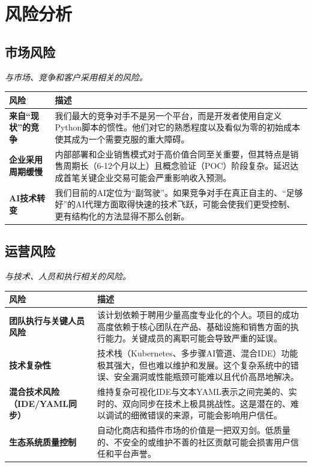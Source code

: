\documentclass[11pt, a4paper, oneside]{article}
\begin{document}
\newpage
\section{风险分析}
\subsection{市场风险}
\textit{与市场、竞争和客户采用相关的风险。}

\begin{table}[H]
\centering
\begin{tabularx}{\textwidth}{@{}lL@{}}
\toprule
\textbf{风险} & \textbf{描述} \\
\midrule
\textbf{来自“现状”的竞争} & 我们最大的竞争对手不是另一个平台，而是开发者使用自定义Python脚本的惯性。他们对它的熟悉程度以及看似为零的初始成本使其成为一个需要克服的重大障碍。 \\
\addlinespace
\textbf{企业采用周期缓慢} & 内部部署和企业销售模式对于高价值合同至关重要，但其特点是销售周期长（6-12个月以上）且概念验证（POC）阶段复杂。延迟达成首笔关键企业交易可能会严重影响收入预测。 \\
\addlinespace
\textbf{AI技术转变} & 我们目前的AI定位为“副驾驶”。如果竞争对手在真正自主的、“足够好”的AI代理方面取得快速的技术飞跃，可能会使我们更受控制、更有结构化的方法显得不那么创新。 \\
\bottomrule
\end{tabularx}
\end{table}

\newpage
\subsection{运营风险}
\textit{与技术、人员和执行相关的风险。}

\begin{table}[H]
\centering
\begin{tabularx}{\textwidth}{@{}lL@{}}
\toprule
\textbf{风险} & \textbf{描述} \\



\midrule
\textbf{团队执行与关键人员风险} & 该计划依赖于聘用少量高度专业化的个人。项目的成功高度依赖于核心团队在产品、基础设施和销售方面的执行能力。关键成员的离职可能会导致严重的延误。 \\
\addlinespace
\textbf{技术复杂性} & 技术栈（Kubernetes、多步骤AI管道、混合IDE）功能极其强大，但也难以维护和发展。这个复杂系统中的错误、安全漏洞或性能瓶颈可能难以且代价高昂地解决。 \\
\addlinespace
\textbf{混合技术风险（IDE/YAML同步）} & 维持复杂可视化IDE与文本YAML表示之间完美的、实时的、双向同步在技术上极具挑战性。这是潜在的、难以调试的细微错误的来源，可能会影响用户信任。 \\
\addlinespace
\textbf{生态系统质量控制} & 自动化商店和插件市场的价值是一把双刃剑。低质量的、不安全的或维护不善的社区贡献可能会损害用户信任和平台声誉。 \\
\bottomrule
\end{tabularx}
\end{table}
\end{document}
